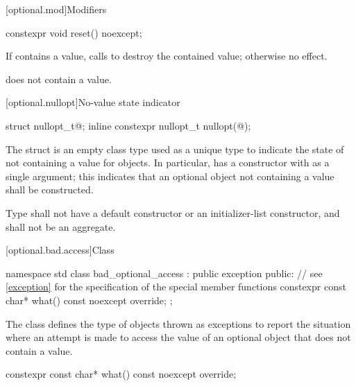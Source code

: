 [optional.mod]{Modifiers}

%
\begin{itemdecl}
constexpr void reset() noexcept;
\end{itemdecl}

\begin{itemdescr}
\pnum
\effects
If  contains a value, calls  to destroy the contained value;
otherwise no effect.

\pnum
\ensures
{} does not contain a value.
\end{itemdescr}

[optional.nullopt]{No-value state indicator}

%
%
\begin{itemdecl}
struct nullopt_t{@\seebelow@};
inline constexpr nullopt_t nullopt(@\unspec@);
\end{itemdecl}

\pnum
The struct  is an empty class type used as a unique type to indicate the state of not containing a value for  objects.
In particular,  has a constructor with  as a single argument;
this indicates that an optional object not containing a value shall be constructed.

\pnum
Type  shall not have a default constructor or an initializer-list constructor, and shall not be an aggregate.

[optional.bad.access]{Class }

\begin{codeblock}
namespace std {
  class bad_optional_access : public exception {
  public:
    // see \ref{exception} for the specification of the special member functions
    constexpr const char* what() const noexcept override;
  };
}
\end{codeblock}

\pnum
The class  defines the type of objects thrown as exceptions to report the situation where an attempt is made to access the value of an optional object that does not contain a value.

%
\begin{itemdecl}
constexpr const char* what() const noexcept override;
\end{itemdecl}

